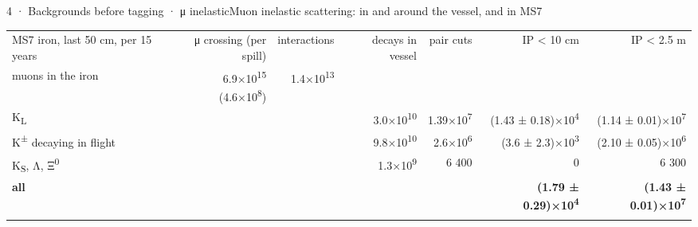 \begin{btframe}{4 · Backgrounds before tagging · μ inelastic}{Muon inelastic scattering: in and around the vessel, and in MS7}
\vspace{2.46pt}
{\fontsize{6.55pt}{6.92pt}\selectfont\setlength{\tabcolsep}{3.19pt}\renewcommand{\arraystretch}{1.42}
\begin{tabularx}{\linewidth}{>{\raggedright\arraybackslash}Xrrrrrr}
\textcolor{muted}{MS7 iron, last 50 cm, per 15 years} & \textcolor{muted}{μ crossing (per spill)} & \textcolor{muted}{interactions} & \textcolor{muted}{decays in vessel} & \textcolor{muted}{pair cuts} & \textcolor{muted}{IP < 10 cm} & \textcolor{muted}{IP < 2.5 m} \\\headrule
muons in the iron & 6.9×10\textsuperscript{15} (4.6×10\textsuperscript{8}) & 1.4×10\textsuperscript{13} & & & & \\\rowrule
K\textsubscript{L} & & & 3.0×10\textsuperscript{10} & 1.39×10\textsuperscript{7} & (1.43 ± 0.18)×10\textsuperscript{4} & (1.14 ± 0.01)×10\textsuperscript{7} \\\rowrule
K\textsuperscript{±} decaying in flight & & & 9.8×10\textsuperscript{10} & 2.6×10\textsuperscript{6} & (3.6 ± 2.3)×10\textsuperscript{3} & (2.10 ± 0.05)×10\textsuperscript{6} \\\rowrule
K\textsubscript{S}, Λ, Ξ\textsuperscript{0} & & & 1.3×10\textsuperscript{9} & 6 400 & 0 & 6 300 \\\rowrule
\hline
\rowcolor{tint}\bfseries all & \bfseries  & \bfseries  & \bfseries  & \bfseries  & \bfseries (1.79 ± 0.29)×10\textsuperscript{4} & \bfseries (1.43 ± 0.01)×10\textsuperscript{7} \\\rowrule
\end{tabularx}\par}
\end{btframe}

